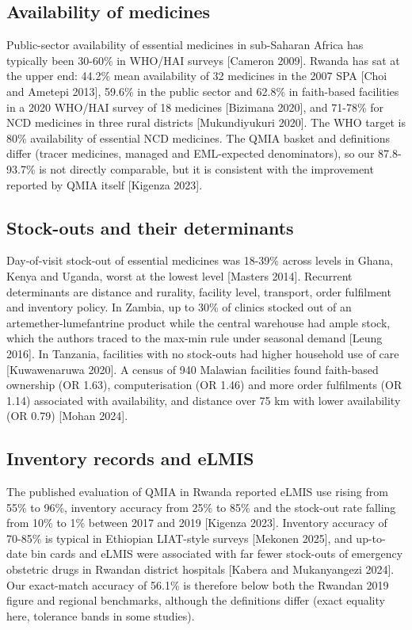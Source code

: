 \documentclass[10pt,a4paper]{report}
\begin{document}
\subsection{Availability of medicines}
Public-sector availability of essential medicines in sub-Saharan Africa has typically been 30-60\% in WHO/HAI surveys [Cameron 2009]. Rwanda has sat at the upper end: 44.2\% mean availability of 32 medicines in the 2007 SPA [Choi and Ametepi 2013], 59.6\% in the public sector and 62.8\% in faith-based facilities in a 2020 WHO/HAI survey of 18 medicines [Bizimana 2020], and 71-78\% for NCD medicines in three rural districts [Mukundiyukuri 2020]. The WHO target is 80\% availability of essential NCD medicines. The QMIA basket and definitions differ (tracer medicines, managed and EML-expected denominators), so our 87.8-93.7\% is not directly comparable, but it is consistent with the improvement reported by QMIA itself [Kigenza 2023].

\subsection{Stock-outs and their determinants}
Day-of-visit stock-out of essential medicines was 18-39\% across levels in Ghana, Kenya and Uganda, worst at the lowest level [Masters 2014]. Recurrent determinants are distance and rurality, facility level, transport, order fulfilment and inventory policy. In Zambia, up to 30\% of clinics stocked out of an artemether-lumefantrine product while the central warehouse had ample stock, which the authors traced to the max-min rule under seasonal demand [Leung 2016]. In Tanzania, facilities with no stock-outs had higher household use of care [Kuwawenaruwa 2020]. A census of 940 Malawian facilities found faith-based ownership (OR 1.63), computerisation (OR 1.46) and more order fulfilments (OR 1.14) associated with availability, and distance over 75 km with lower availability (OR 0.79) [Mohan 2024].

\subsection{Inventory records and eLMIS}
The published evaluation of QMIA in Rwanda reported eLMIS use rising from 55\% to 96\%, inventory accuracy from 25\% to 85\% and the stock-out rate falling from 10\% to 1\% between 2017 and 2019 [Kigenza 2023]. Inventory accuracy of 70-85\% is typical in Ethiopian LIAT-style surveys [Mekonen 2025], and up-to-date bin cards and eLMIS were associated with far fewer stock-outs of emergency obstetric drugs in Rwandan district hospitals [Kabera and Mukanyangezi 2024]. Our exact-match accuracy of 56.1\% is therefore below both the Rwandan 2019 figure and regional benchmarks, although the definitions differ (exact equality here, tolerance bands in some studies).
\end{document}
